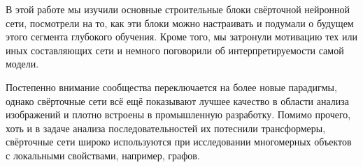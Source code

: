 \documentclass[12pt, fleqn]{article}
\begin{document}
    В этой работе мы изучили основные строительные блоки свёрточной нейронной сети, посмотрели на то, как эти блоки можно 
    настраивать и подумали о будущем этого сегмента глубокого обучения. Кроме того, мы затронули мотивацию тех или иных 
    составляющих сети и немного поговорили об интерпретируемости самой модели.

    Постепенно внимание сообщества переключается на более новые парадигмы, однако свёрточные сети всё ещё показывают лучшее 
    качество в области анализа изображений и плотно встроены в промышленную разработку. Помимо прочего, хоть и в задаче 
    анализа последовательностей их потеснили трансформеры, свёрточные сети широко используются при исследовании многомерных 
    объектов с локальными свойствами, например, графов.

    \newpage
    
    
    
\end{document}

